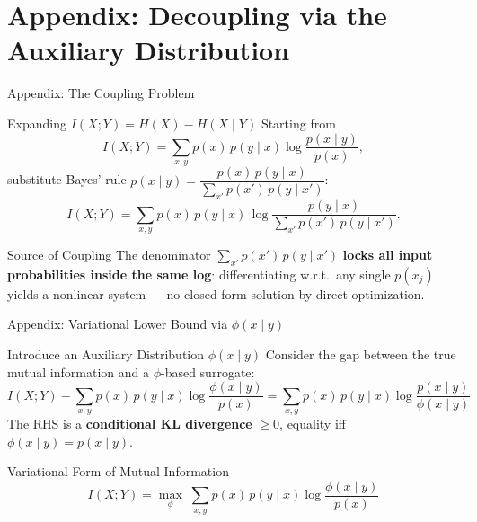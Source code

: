 \documentclass{beamer}
\begin{document}
\appendix
\section*{Appendix: Decoupling via the Auxiliary Distribution}

\begin{frame}{Appendix: The Coupling Problem}
    \begin{block}{Expanding $I(X;Y) = H(X) - H(X \mid Y)$}
        Starting from
        $$
            I(X;Y) = \sum_{x,y} p(x)\,p(y\mid x) \log \frac{p(x\mid y)}{p(x)},
        $$
        substitute Bayes' rule $p(x\mid y) = \dfrac{p(x)\,p(y\mid x)}{\sum_{x'} p(x')\,p(y\mid x')}$:
        $$
            I(X;Y) = \sum_{x,y} p(x)\,p(y\mid x)\, \log \frac{p(y\mid x)}{\sum_{x'} p(x')\,p(y\mid x')}.
        $$
    \end{block}

    \begin{alertblock}{Source of Coupling}
        The denominator $\sum_{x'} p(x')\,p(y\mid x')$ \textbf{locks all input probabilities inside the same log}: differentiating w.r.t.\ any single $p(x_j)$ yields a nonlinear system — no closed-form solution by direct optimization.
    \end{alertblock}
\end{frame}

\begin{frame}{Appendix: Variational Lower Bound via $\phi(x \mid y)$}
    \begin{block}{Introduce an Auxiliary Distribution $\phi(x \mid y)$}
        Consider the gap between the true mutual information and a $\phi$-based surrogate:
        $$
            I(X;Y) - \sum_{x,y} p(x)\,p(y\mid x) \log \frac{\phi(x\mid y)}{p(x)} = \sum_{x,y} p(x)\,p(y\mid x) \log \frac{p(x\mid y)}{\phi(x\mid y)}
        $$
        The RHS is a \textbf{conditional KL divergence} $\geq 0$, equality iff $\phi(x\mid y) = p(x\mid y)$.
    \end{block}

    \begin{exampleblock}{Variational Form of Mutual Information}
        $$
            I(X;Y) = \max_{\phi}\; \sum_{x,y} p(x)\,p(y\mid x) \log \frac{\phi(x\mid y)}{p(x)}
        $$
    \end{exampleblock}
\end{frame}
\end{document}
